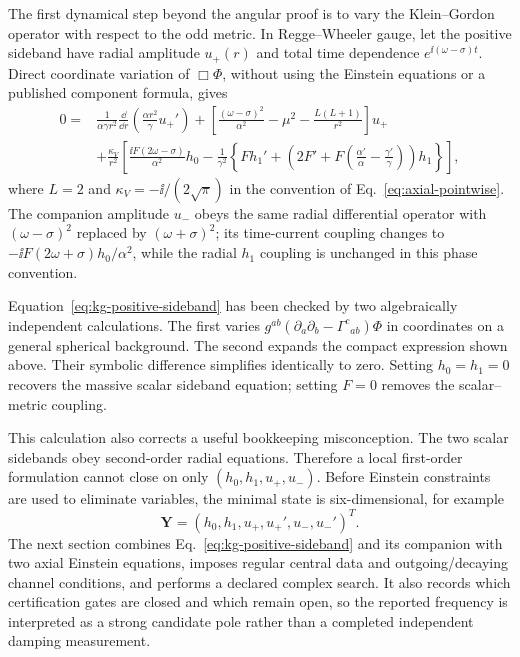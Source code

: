 The first dynamical step beyond the angular proof is to vary the
Klein--Gordon operator with respect to the odd metric.  In Regge--Wheeler
gauge, let the positive sideband have radial amplitude $u_+(r)$ and total
time dependence $e^{\ii(\omega-\sigma)t}$.  Direct coordinate variation of
$\Box\Phi$, without using the Einstein equations or a published component
formula, gives
\begin{align}
0={}&\frac{1}{\alpha\gamma r^2}\frac{\dd}{\dd r}
\left(\frac{\alpha r^2}{\gamma}u_+'\right)
+\left[\frac{(\omega-\sigma)^2}{\alpha^2}-\mu^2-
\frac{L(L+1)}{r^2}\right]u_+ \nonumber\\
&+\frac{\kappa_V}{r^2}\left[
\frac{\ii F(2\omega-\sigma)}{\alpha^2}h_0
-\frac{1}{\gamma^2}\left\{Fh_1'
+\left(2F'+F\left(\frac{\alpha'}{\alpha}-
\frac{\gamma'}{\gamma}\right)\right)h_1\right\}\right],
\label{eq:kg-positive-sideband}
\end{align}
where $L=2$ and $\kappa_V=-\ii/(2\sqrt\pi)$ in the convention of
Eq.~\eqref{eq:axial-pointwise}.  The companion amplitude $u_-$ obeys the
same radial differential operator with $(\omega-\sigma)^2$ replaced by
$(\omega+\sigma)^2$; its time-current coupling changes to
$-\ii F(2\omega+\sigma)h_0/\alpha^2$, while the radial $h_1$ coupling is
unchanged in this phase convention.

Equation~\eqref{eq:kg-positive-sideband} has been checked by two algebraically
independent calculations.  The first varies
$g^{ab}(\partial_a\partial_b-\Gamma^c{}_{ab})\Phi$ in coordinates on a
general spherical background.  The second expands the compact expression
shown above.  Their symbolic difference simplifies identically to zero.
Setting $h_0=h_1=0$ recovers the massive scalar sideband equation; setting
$F=0$ removes the scalar--metric coupling.

This calculation also corrects a useful bookkeeping misconception.  The two
scalar sidebands obey second-order radial equations.  Therefore a local
first-order formulation cannot close on only $(h_0,h_1,u_+,u_-)$.  Before
Einstein constraints are used to eliminate variables, the minimal state is
six-dimensional, for example
\begin{equation}
\bm{Y}=(h_0,h_1,u_+,u_+',u_-,u_-')^{T}.
\label{eq:minimal-axial-state}
\end{equation}
The next section combines Eq.~\eqref{eq:kg-positive-sideband} and its
companion with two axial Einstein equations, imposes regular central data and
outgoing/decaying channel conditions, and performs a declared complex search.
It also records which certification gates are closed and which remain open,
so the reported frequency is interpreted as a strong candidate pole rather
than a completed independent damping measurement.
